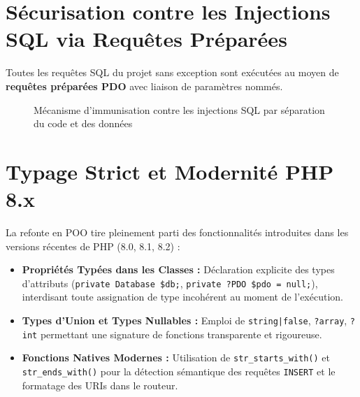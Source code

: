 \documentclass[11pt,a4paper,oneside]{report}
\begin{document}
\section{Sécurisation contre les Injections SQL via Requêtes Préparées}

Toutes les requêtes SQL du projet sans exception sont exécutées au moyen de \textbf{requêtes préparées PDO} avec liaison de paramètres nommés.

\begin{figure}[H]
    \centering
    \caption{Mécanisme d'immunisation contre les injections SQL par séparation du code et des données}
    \label{fig:injection_prevention}
\end{figure}

\section{Typage Strict et Modernité PHP 8.x}

La refonte en POO tire pleinement parti des fonctionnalités introduites dans les versions récentes de PHP (8.0, 8.1, 8.2) :
\begin{itemize}[label=\textcolor{primaryMed}{\textbullet}]
    \item \textbf{Propriétés Typées dans les Classes :} Déclaration explicite des types d'attributs (\texttt{private Database \$db;}, \texttt{private ?PDO \$pdo = null;}), interdisant toute assignation de type incohérent au moment de l'exécution.
    \item \textbf{Types d'Union et Types Nullables :} Emploi de \texttt{string|false}, \texttt{?array}, \texttt{?int} permettant une signature de fonctions transparente et rigoureuse.
    \item \textbf{Fonctions Natives Modernes :} Utilisation de \texttt{str\_starts\_with()} et \texttt{str\_ends\_with()} pour la détection sémantique des requêtes \texttt{INSERT} et le formatage des URIs dans le routeur.
\end{itemize}
\end{document}
